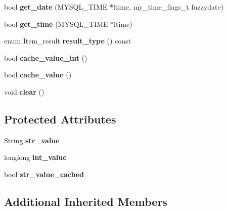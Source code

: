 \begin{DoxyCompactItemize}
bool {\bfseries get\+\_\+date} (M\+Y\+S\+Q\+L\+\_\+\+T\+I\+ME $\ast$ltime, my\+\_\+time\+\_\+flags\+\_\+t fuzzydate)
\item 
\mbox{\label{classItem__cache__datetime_a1e50c42a7868c999d855d01cf163a1cd}} 
bool {\bfseries get\+\_\+time} (M\+Y\+S\+Q\+L\+\_\+\+T\+I\+ME $\ast$ltime)
\item 
\mbox{\label{classItem__cache__datetime_a9953530a20134f84dd1e57cc6ec426f0}} 
enum Item\+\_\+result {\bfseries result\+\_\+type} () const
\item 
\mbox{\label{classItem__cache__datetime_af4d1545b585d74e90f85a3124f9f1f3a}} 
bool {\bfseries cache\+\_\+value\+\_\+int} ()
\item 
\mbox{\label{classItem__cache__datetime_a6a60c5c0ccd6889f872d6fd659ce2756}} 
bool {\bfseries cache\+\_\+value} ()
\item 
\mbox{\label{classItem__cache__datetime_ac3085dd617ce4ccaa14b5d1928f06ff5}} 
void {\bfseries clear} ()
\end{DoxyCompactItemize}
\subsection*{Protected Attributes}
\begin{DoxyCompactItemize}
\item 
\mbox{\label{classItem__cache__datetime_a34eca0d1e7b5a0f3202f2f462002ec67}} 
String {\bfseries str\+\_\+value}
\item 
\mbox{\label{classItem__cache__datetime_a0cca012157bd0e9d83b61520de66c7b6}} 
longlong {\bfseries int\+\_\+value}
\item 
\mbox{\label{classItem__cache__datetime_a9945be191a52dc00400497179181671d}} 
bool {\bfseries str\+\_\+value\+\_\+cached}
\end{DoxyCompactItemize}
\subsection*{Additional Inherited Members}


